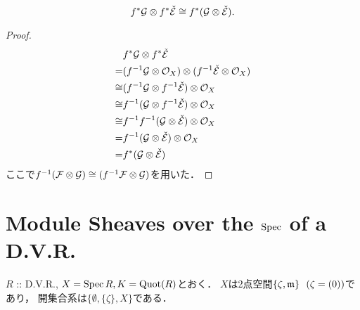 \documentclass[a4paper]{jsarticle}
\begin{document}
    \begin{Claim}
        \[ f^* \mathcal{G} \otimes f^* \check{\mathcal{E}} \cong f^* (\mathcal{G} \otimes \check{\mathcal{E}}). \]
    \end{Claim}
    \begin{proof}
        \begin{align*}
            {}&     f^* \mathcal{G} \otimes f^* \check{\mathcal{E}} \\
            =&      (f^{-1}\mathcal{G} \otimes \mathcal{O}_X) \otimes (f^{-1}\check{\mathcal{E}} \otimes \mathcal{O}_X) \\
            \cong&  (f^{-1}\mathcal{G} \otimes f^{-1}\check{\mathcal{E}}) \otimes \mathcal{O}_X \\
            \cong&  f^{-1}(\mathcal{G} \otimes f^{-1}\check{\mathcal{E}}) \otimes \mathcal{O}_X \\
            \cong&  f^{-1}f^{-1}(\mathcal{G} \otimes \check{\mathcal{E}}) \otimes \mathcal{O}_X \\
            =&      f^{-1}(\mathcal{G} \otimes \check{\mathcal{E}}) \otimes \mathcal{O}_X \\
            =&      f^*(\mathcal{G} \otimes \check{\mathcal{E}})
        \end{align*}
        ここで$f^{-1}(\mathcal{F} \otimes \mathcal{G}) \cong (f^{-1}\mathcal{F} \otimes \mathcal{G})$を用いた．
    \end{proof}

\section{Module Sheaves over the $\operatorname{Spec}$ of a D.V.R.} %
    $R$ :: D.V.R., $X=\operatorname{Spec} R, K=\operatorname{Quot}(R)$とおく．
    $X$は2点空間$\{ \zeta, \mathfrak{m} \}~~(\zeta=(0))$であり，
    開集合系は$\{ \emptyset, \{\zeta\}, X \}$である．
\end{document}
